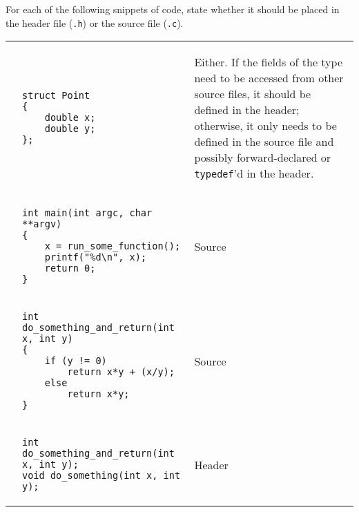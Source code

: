 For each of the following snippets of code, state whether it should be placed in the header file (\texttt{.h}) or the source file (\texttt{.c}).

\begin{enumerate}

\begin{tabular}{p{.25in}p{1.5in} p{4.5in}}
\item
&
{
\begin{lstlisting}[numbers=none]
struct Point
{
	double x;
	double y;
};
\end{lstlisting}
}
&
\begin{answer}
Either. If the fields of the type need to be accessed from other source files, it should be defined in the header; otherwise, it only needs to be defined in the source file and possibly forward-declared or \texttt{typedef}'d in the header.
\end{answer}
\\
\item
&
{
\begin{lstlisting}[numbers=none]
int main(int argc, char **argv)
{
	x = run_some_function();
	printf("%d\n", x);
	return 0;
}
\end{lstlisting}
}
&
\begin{answer}
\hspace{1.5in}
Source
\end{answer}
\\
\item
&
{
\begin{lstlisting}[numbers=none]
int do_something_and_return(int x, int y)
{
	if (y != 0)
		return x*y + (x/y);
	else
		return x*y;
}
\end{lstlisting}
}
&
\begin{answer}
\hspace{2.5in}
Source
\end{answer}
\\
\item
&
{
\begin{lstlisting}[numbers=none]
int do_something_and_return(int x, int y);
void do_something(int x, int y);
\end{lstlisting}
}
&
\begin{answer}
\hspace{2.5in}
Header
\end{answer}
\\
\end{tabular}
\end{enumerate}
